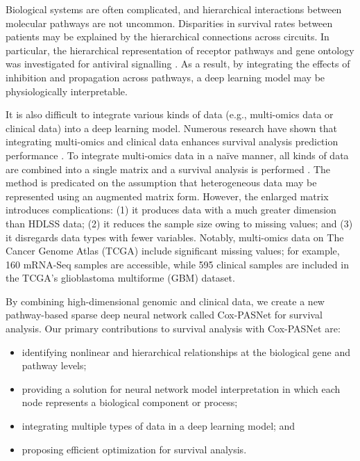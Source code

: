 \documentclass[10pt,twocolumn,twoside,lineno]{gsajnl}
\begin{document}
Biological systems are often complicated, and hierarchical interactions between molecular pathways are not uncommon. Disparities in survival rates between patients may be explained by the hierarchical connections across circuits. In particular, the hierarchical representation of receptor pathways and gene ontology was investigated for antiviral signalling \citep{Masson2014}. As a result, by integrating the effects of inhibition and propagation across pathways, a deep learning model may be physiologically interpretable.



It is also difficult to integrate various kinds of data (e.g., multi-omics data or clinical data) into a deep learning model. Numerous research have shown that integrating multi-omics and clinical data enhances survival analysis prediction performance \citep{Yousefi2017, 10.1371/journal.pone.0154313, Zhu2017}. To integrate multi-omics data in a naïve manner, all kinds of data are combined into a single matrix and a survival analysis is performed \citep{Yousefi2017, Zhang2013}. The method is predicated on the assumption that heterogeneous data may be represented using an augmented matrix form. However, the enlarged matrix introduces complications: (1) it produces data with a much greater dimension than HDLSS data; (2) it reduces the sample size owing to missing values; and (3) it disregards data types with fewer variables. Notably, multi-omics data on The Cancer Genome Atlas (TCGA) include significant missing values; for example, 160 mRNA-Seq samples are accessible, while 595 clinical samples are included in the TCGA's glioblastoma multiforme (GBM) dataset.



By combining high-dimensional genomic and clinical data, we create a new pathway-based sparse deep neural network called Cox-PASNet for survival analysis.
Our primary contributions to survival analysis with Cox-PASNet are: 
\begin{itemize}
	\item identifying nonlinear and hierarchical relationships at the biological gene and pathway levels;
	\item providing a solution for neural network model interpretation in which each node represents a biological component or process;
	\item integrating multiple types of data in a deep learning model; and
	\item proposing efficient optimization for survival analysis.
\end{itemize}
\end{document}
